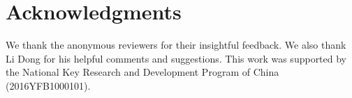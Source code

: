 \documentclass[11pt,a4paper]{article}
\begin{document}
\section*{Acknowledgments}
We thank the anonymous reviewers for their insightful feedback.
We also thank Li Dong for his helpful comments and suggestions.
This work was supported by the National Key Research and Development Program of China
(2016YFB1000101).
 


\end{document}
